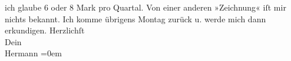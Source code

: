 \begin{ledgroupsized}[t]{13cm}
               ich glaube 6 oder 8 Mark pro Quartal. Von einer anderen »Zeichnung« iſt mir nichts
               bekannt. Ich komme übrigens Montag zurück u. werde mich dann erkundigen.\pend
           \pstart
           Herzlichſt{\\[\baselineskip]}Dein{\\[\baselineskip]}\spacefill\mbox{Hermann}\pend
           \leftskip=0em{}\endnumbering{}\end{ledgroupsized}  \newcommand{\dateiname}{L01291}\newcommand{\titel}{Hermann Bahr an Arthur Schnitzler, 21. 5. 1903}\newcommand{\editorInnen}{ Kurt Ifkovits,  Martin Anton Müller}
            \footnotesize
\begin{ledgroupsized}[t]{11.5cm}
\end{ledgroupsized}
         
      